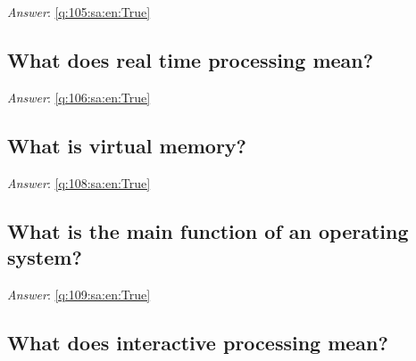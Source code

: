 \documentclass[a4paper,11pt,oneside]{article}
\begin{document}
\begin{sloppypar}
\vspace{1cm}

\textit{Answer}: \autoref{q:105:sa:en:True}



\subsection{What does real time processing mean?}

\label{q:106:sa:en:False}

\vspace{2cm}

\noindent\makebox[\textwidth]{\hrulefill}

\vspace{1cm}

\textit{Answer}: \autoref{q:106:sa:en:True}



\subsection{What is virtual memory?}

\label{q:108:sa:en:False}

\vspace{2cm}

\noindent\makebox[\textwidth]{\hrulefill}

\vspace{1cm}

\textit{Answer}: \autoref{q:108:sa:en:True}



\subsection{What is the main function of an operating system?}

\label{q:109:sa:en:False}

\vspace{2cm}

\noindent\makebox[\textwidth]{\hrulefill}

\vspace{1cm}

\textit{Answer}: \autoref{q:109:sa:en:True}



\subsection{What does interactive processing mean?}


\end{sloppypar}
\end{document}
